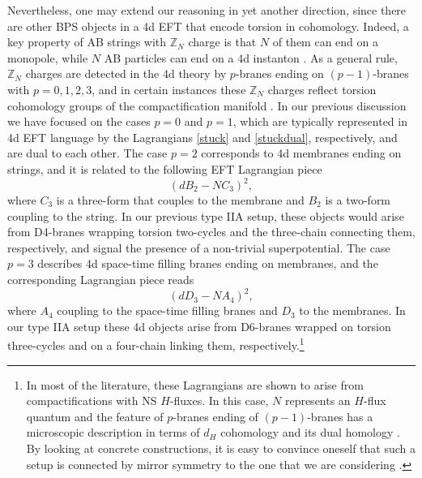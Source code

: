 \documentclass[11pt]{article}
\def\be{\begin{equation}}
\def\ee{\end{equation}}
\newcommand{\IZ}{\mathbb{Z}}
\begin{document}
Nevertheless, one may extend our reasoning in yet another direction, since there are other BPS objects in a 4d EFT that encode torsion in cohomology. Indeed, a key property of AB strings with $\IZ_N$ charge is that $N$ of them can end on a monopole, while $N$ AB particles can end on a 4d instanton \cite{Banks:2010zn}. As a general rule, $\IZ_N$ charges are detected in the 4d theory by $p$-branes ending on $(p-1)$-branes with $p = 0,1,2,3$, and in certain instances these $\IZ_N$ charges reflect torsion cohomology groups of the compactification manifold \cite{Berasaluce-Gonzalez:2012awn}. In our previous discussion we have focused on the cases $p=0$ and $p=1$, which are typically represented in 4d EFT language by the Lagrangians \eqref{stuck} and \eqref{stuckdual}, respectively, and are dual to each other. The case $p=2$ corresponds to 4d membranes ending on strings, and it is related to the following EFT Lagrangian piece \cite{Marchesano:2014mla}
\be
\left( dB_2 - N C_3\right)^2 ,
\label{p=2}
\ee
where $C_3$ is a three-form that couples to the membrane and $B_2$ is a two-form coupling to the string. In our previous type IIA setup, these objects would arise from D4-branes wrapping torsion two-cycles and the three-chain connecting them, respectively, and signal the presence of a non-trivial superpotential. The case $p=3$ describes 4d space-time filling branes ending on membranes, and the corresponding Lagrangian piece reads \cite{Lanza:2019xxg}
\be
\left( dD_3 - N A_4\right)^2 ,
\label{p=3}
\ee
where $A_4$ coupling to the space-time filling branes and $D_3$ to the membranes. In our type IIA setup these 4d objects arise from D6-branes wrapped on torsion three-cycles and on a four-chain linking them, respectively.\footnote{In most of the literature, these Lagrangians are shown to arise from compactifications with NS $H$-fluxes. In this case, $N$ represents an $H$-flux quantum and the feature of $p$-branes ending of $(p-1)$-branes has a microscopic description in terms of $d_H$ cohomology and its dual homology \cite{Evslin:2007ti}. By looking at concrete constructions, it is easy to convince oneself that such a setup is connected by mirror symmetry to the one that we are considering \cite{Tomasiello:2005bp,Marchesano:2006ns}.} 
\end{document}
